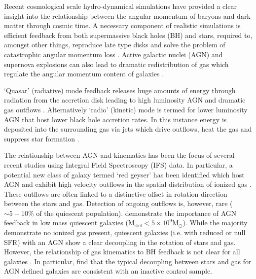 \documentclass[fleqn,usenatbib]{mnras}
\begin{document}
Recent cosmological scale hydro-dynamical simulations have provided a clear insight into the relationship between the angular momentum of baryons and dark matter through cosmic time. A necessary component of realistic simulations is efficient feedback from both supermassive black holes (BH) and stars, required to, amongst other things, reproduce late type disks and solve the problem of catastrophic angular momentum loss \citep[e.g.][]{zavala2008, scannapieco2009}. Active galactic nuclei (AGN) and supernova explosions can also lead to dramatic redistribution of gas which regulate the angular momentum content of galaxies \citep[e.g.][]{genel2015, DeFelippis2017}. 

`Quasar' (radiative) mode feedback releases huge amounts of energy through radiation from the accretion disk leading to high luminosity AGN and dramatic gas outflows \citep[e.g.][]{cattaneo2009, rubin2014, cheung2016}. Alternatively `radio' (kinetic) mode is termed for lower luminosity AGN that host lower black hole accretion rates. In this instance energy is deposited into the surrounding gas via jets which drive outflows, heat the gas and suppress star formation \citep[][]{binney1995, ciotti2001, heckman2014}.

The relationship between AGN and kinematics has been the focus of several recent studies using Integral Field Spectroscopy (IFS) data. In particular, a potential new class of galaxy termed `red geyser' has been identified which host AGN and exhibit high velocity outflows in the spatial distribution of ionized gas \citep[][]{cheung2016, roy2018}. These outflows are often linked to a distinctive offset in rotation direction between the stars and gas. Detection of ongoing outflows is, however, rare ($\sim5-10$\% of the quiescent population). \citet{penny2018} demonstrate the importance of AGN feedback in low mass quiescent galaxies ($\mathrm{M_{stel} < 5 \times 10^{9}M_{\odot}}$). While the majority demonstrate no ionized gas present, quiescent galaxies (i.e. with reduced or null SFR) with an AGN show a clear decoupling in the rotation of stars and gas. However, the relationship of gas kinematics to BH feedback is not clear for all galaxies \citep[see also:][]{koudmani2019}. In particular, \citet{ilha2019} find that the typical decoupling between stars and gas for AGN defined galaxies are consistent with an inactive control sample. 
\end{document}
